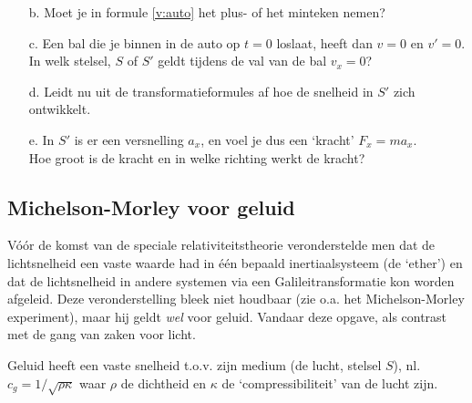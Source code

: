 \begin{itemize}
\item [b.]
Moet je in formule \ref{v:auto} het plus- of het minteken nemen?
\item [c.]
Een bal die je binnen in de auto op $t = 0$ loslaat, heeft dan $v = 0$ en 
$v' = 0$.\\
In welk stelsel, $S$ of $S'$ geldt tijdens de val van de bal 
$v_{x} = 0$? 
\item [d.]
Leidt nu uit de transformatieformules  af  hoe de snelheid in $S'$
zich ontwikkelt.
\item [e.]
In  $S'$ is er een versnelling $a_{x}$, en voel je dus
een `kracht' $F_{x }= ma_{x}$.\\
Hoe groot is de kracht en in welke richting werkt de kracht?
\end{itemize}

\subsection {Michelson-Morley voor geluid}
V\'{o}\'{o}r  de komst van de speciale relativiteitstheorie veronderstelde 
men dat de lichtsnelheid een vaste  waarde  had in \'{e}\'{e}n 
bepaald inertiaalsysteem (de `ether') en dat de lichtsnelheid in 
andere systemen  via  een  Galileitransformatie kon worden afgeleid. 
Deze veronderstelling bleek niet houdbaar  (zie  o.a.  het  
Michelson-Morley experiment), maar hij geldt {\it wel} voor geluid. 
Vandaar deze opgave, als contrast met de gang van zaken voor licht.

Geluid  heeft  een  vaste  snelheid  t.o.v.  zijn  medium  
(de  lucht,  stelsel $S$),  nl. 
$c_{g} = 1/\sqrt{\rho\kappa}$
waar $\rho$ de dichtheid en $\kappa$ de `compressibiliteit' van de lucht zijn.


